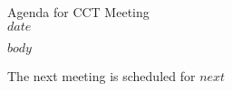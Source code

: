 \documentclass[english,12pt]{article}
\begin{document}
\begin{center}
\large{Agenda for CCT Meeting} \\
\large{$date$}
\end{center}

$body$

\vspace{.5in}

The next meeting is scheduled for \textsl{$next$}
\end{document}
